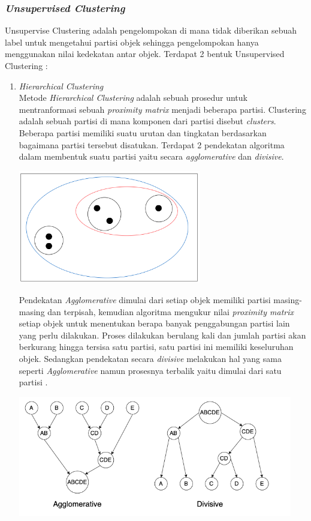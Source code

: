 \subsubsection{\textit{Unsupervised Clustering}}
Unsupervise Clustering adalah pengelompokan di mana tidak diberikan sebuah label untuk mengetahui partisi objek sehingga pengelompokan hanya menggunakan nilai kedekatan antar objek. Terdapat 2 bentuk Unsupervised Clustering \cite{2C9}:
\begin{enumerate}[leftmargin=1.3cm]
	\item \textit{Hierarchical Clustering} \\
	Metode \textit{Hierarchical Clustering} adalah sebuah prosedur untuk mentranformasi sebuah \textit{proximity matrix} menjadi beberapa partisi. Clustering adalah sebuah partisi di mana komponen dari partisi disebut \textit{clusters}. Beberapa partisi memiliki suatu urutan dan tingkatan berdasarkan bagaimana partisi tersebut disatukan. Terdapat 2 pendekatan algoritma dalam membentuk suatu partisi yaitu secara \textit{agglomerative} dan \textit{divisive}.\cite{2C9} 

	\begin{center}
		\includegraphics[width=8cm]{img/bab_2/hierarchi.png}
		\label{fig:asd}
	\end{center}

	Pendekatan \textit{Agglomerative} dimulai dari setiap objek memiliki partisi masing-masing dan terpisah, kemudian algoritma mengukur nilai \textit{proximity matrix} setiap objek untuk menentukan berapa banyak penggabungan partisi lain yang perlu dilakukan. Proses dilakukan berulang kali dan jumlah partisi akan berkurang hingga tersisa satu partisi, satu partisi ini memiliki keseluruhan objek. Sedangkan pendekatan secara \textit{divisive} melakukan hal yang sama seperti \textit{Agglomerative} namun prosesnya terbalik yaitu dimulai dari satu partisi \cite{2C9}.

	\begin{center}
		\includegraphics[width=12cm]{img/bab_2/agVSDiv.png}
		\label{fig:asd}
	\end{center}


\end{enumerate}
